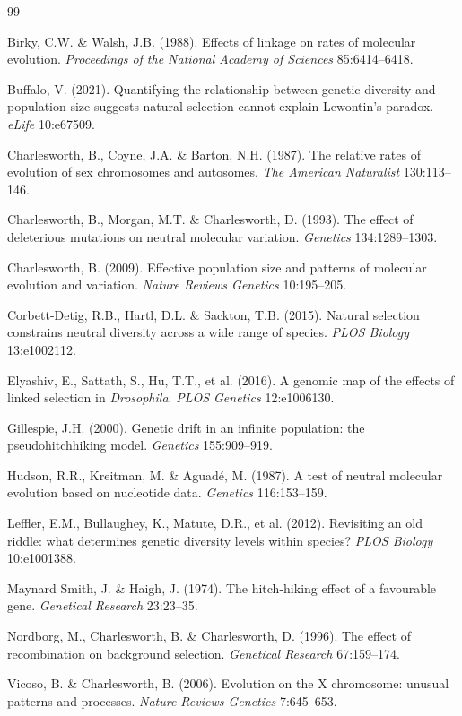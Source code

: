 \documentclass[11pt,a4paper]{article}
\begin{document}
\begin{thebibliography}{99}

 Birky, C.W. \& Walsh, J.B. (1988). Effects of linkage on rates of molecular evolution. \emph{Proceedings of the National Academy of Sciences} 85:6414--6418.

 Buffalo, V. (2021). Quantifying the relationship between genetic diversity and population size suggests natural selection cannot explain Lewontin's paradox. \emph{eLife} 10:e67509.

 Charlesworth, B., Coyne, J.A. \& Barton, N.H. (1987). The relative rates of evolution of sex chromosomes and autosomes. \emph{The American Naturalist} 130:113--146.

 Charlesworth, B., Morgan, M.T. \& Charlesworth, D. (1993). The effect of deleterious mutations on neutral molecular variation. \emph{Genetics} 134:1289--1303.

 Charlesworth, B. (2009). Effective population size and patterns of molecular evolution and variation. \emph{Nature Reviews Genetics} 10:195--205.

 Corbett-Detig, R.B., Hartl, D.L. \& Sackton, T.B. (2015). Natural selection constrains neutral diversity across a wide range of species. \emph{PLOS Biology} 13:e1002112.

 Elyashiv, E., Sattath, S., Hu, T.T., et al. (2016). A genomic map of the effects of linked selection in \emph{Drosophila}. \emph{PLOS Genetics} 12:e1006130.

 Gillespie, J.H. (2000). Genetic drift in an infinite population: the pseudohitchhiking model. \emph{Genetics} 155:909--919.

 Hudson, R.R., Kreitman, M. \& Aguad\'e, M. (1987). A test of neutral molecular evolution based on nucleotide data. \emph{Genetics} 116:153--159.

 Leffler, E.M., Bullaughey, K., Matute, D.R., et al. (2012). Revisiting an old riddle: what determines genetic diversity levels within species? \emph{PLOS Biology} 10:e1001388.

 Maynard Smith, J. \& Haigh, J. (1974). The hitch-hiking effect of a favourable gene. \emph{Genetical Research} 23:23--35.

 Nordborg, M., Charlesworth, B. \& Charlesworth, D. (1996). The effect of recombination on background selection. \emph{Genetical Research} 67:159--174.

 Vicoso, B. \& Charlesworth, B. (2006). Evolution on the X chromosome: unusual patterns and processes. \emph{Nature Reviews Genetics} 7:645--653.

\end{thebibliography}
\end{document}
